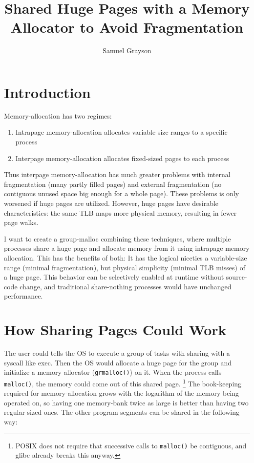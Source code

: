\documentclass[sigconf,screen,nonacm,natbib]{acmart}
\title{Shared Huge Pages with a Memory Allocator to Avoid Fragmentation}
\author{Samuel Grayson}
\begin{document}
\maketitle

\section{Introduction}

Memory-allocation has two regimes:

\begin{enumerate}
\item Intrapage memory-allocation allocates variable size ranges to a specific process
\item Interpage memory-allocation allocates fixed-sized pages to each process
\end{enumerate}

Thus interpage memory-allocation has much greater problems with internal fragmentation (many partly filled pages) and external fragmentation (no contiguous unused space big enough for a whole page).
These problems is only worsened if huge pages are utilized.
However, huge pages have desirable characteristics: the same TLB maps more physical memory, resulting in fewer page walks.

I want to create a group-malloc combining these techniques, where multiple processes share a huge page and allocate memory from it using intrapage memory allocation.
This has the benefits of both: It has the logical niceties a variable-size range (minimal fragmentation), but physical simplicity (minimal TLB misses) of a huge page.
This behavior can be selectively enabled at runtime without source-code change, and traditional share-nothing processes would have unchanged performance.

\section{How Sharing Pages Could Work}

The user could tells the OS to execute a group of tasks with sharing with a syscall like exec.
Then the OS would allocate a huge page for the group and initialize a memory-allocator (\texttt{grmalloc()}) on it.
When the process calls \texttt{malloc()}, the memory could come out of this shared page.
\footnote{POSIX does not require that successive calls to \texttt{malloc()} be contiguous,\cite{posix-malloc} and glibc already breaks this anyway.\cite{man-malloc}}
The book-keeping required for memory-allocation grows with the logarithm of the memory being operated on, so having one memory-bank twice as large is better than having two regular-sized ones.
The other program segments can be shared in the following way:
\end{document}
